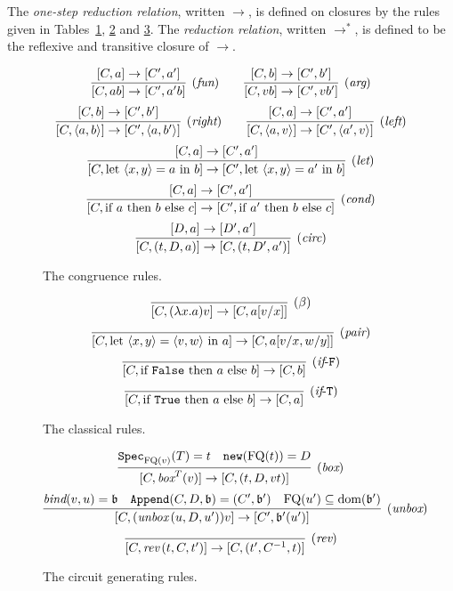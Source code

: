 \documentclass[twoside]{article}
\begin{document}
\begin{definition}
The \emph{one-step reduction relation}, written $\to$, is defined 
on closures by the rules given in Tables~\hyperref[cong_rules]{\ref*{cong_rules}}, 
\hyperref[classical_rules]{\ref*{classical_rules}} 
and \hyperref[circ_gen_rules]{\ref*{circ_gen_rules}}. 
The \emph{reduction relation}, 
written $\to^*$, is defined to be the reflexive and transitive closure of $\to$.
\end{definition}

\begin{figure}[p]
\begin{mdframed}
\[
  \infer[(\rul{fun})]{[C,ab]\to[C',a'b]}{
    [C,a]\to[C',a']
  }
~~~~~~
  \infer[(\rul{arg})]{[C,vb]\to [C',vb']}{
    [C,b]\to [C',b']
  }
\]
\[
  \infer[(\rul{right})]{[C,\langle a,b\rangle]\to [C',\langle a,b'\rangle]}{
    [C,b]\to [C',b']
  }
~~~~~~
  \infer[(\rul{left})]{[C,\langle a,v\rangle]\to [C',\langle a',v\rangle]}{
    [C,a]\to [C',a']
  }
\]
\[
  \infer[(\rul{let})]{[C,\letin{\p{x,y}}{a}{b}]\to 
                [C', \letin{\p{x,y}}{a'}{b}]}{
    [C,a]\to [C',a']
  }
\]
\[
  \infer[(\rul{cond})]{[C, \ifthenelse{a}{b}{c}]\to [C', \ifthenelse{a'}{b}{c}]}{
    [C,a]\to [C',a']
  }
\]
\[
  \infer[(\rul{circ})]{[C, (t,D,a)]\to [C, (t,D',a')]}{
    [D,a]\to [D',a']
  }
\]
\end{mdframed}
\caption{The congruence rules.}
\label{cong_rules}
\end{figure}

\begin{figure}[p]
\begin{mdframed}
\[
  \infer[(\beta)]{[C,(\lambda x.a)v]\to [C, a[v/x]]}{}
\]
\[
  \infer[(\rul{pair})]{[C,\letin{\p{x,y}}{\p{v,w}}{a}]\to[C,a[v/x,w/y]]}{}
\]
\[
  \infer[(\rul{if}\mbox{-}\mathtt{F})]{[C,\ifthenelse{\mathtt{False}}{a}{b}] \to [C, b]}{}
\]
\[
  \infer[(\rul{if}\mbox{-}\mathtt{T})]{[C,\ifthenelse{\mathtt{True}}{a}{b}] \to [C, a]}{}
\]
\end{mdframed}
\caption{The classical rules.}
\label{classical_rules}
\end{figure}

\begin{figure}[p]
\begin{mdframed}
\[
  \infer[(\boxx)]{[C,\boxx^T(v)]\to [C,(t,D,vt)]}{
    \spec_{\FQ(v)}(T)=t
    &
    \mathtt{new}(\FQ(t))=D
  }
\]
\[
  \infer[(\unbox)]{[C,(\unbox\,(u,D,u'))v]\to [C',\binding'(u')]}{
    \bind(v,u)=\binding 
    &
    \mathtt{Append}(C,D,\binding) = (C',\binding') 
    &
    \FQ(u')\seq\dom(\binding')
  }
\]
\[
  \infer[(\rev)]{[C,\rev\,(t,C,t')]\to [C,(t',C^{-1},t)]}{}
\]
\end{mdframed}
\caption{The circuit generating rules.}
\label{circ_gen_rules}
\end{figure}
\end{document}
